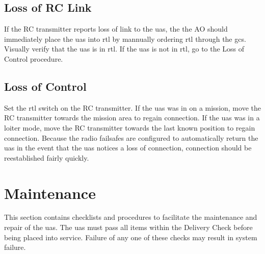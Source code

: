 \documentclass{report}
\begin{document}
	\section{Loss of RC Link}
		If the RC transmitter reports loss of link to the \gls{uas}, the the \gls{AO} should immediately place the \gls{uas} into \gls{rtl} by mannually ordering \gls{rtl} through the \gls{gcs}.  Visually verify that the \gls{uas} is in \gls{rtl}.  If the \gls{uas} is not in \gls{rtl}, go to the Loss of Control procedure.
	\section{Loss of Control}
		Set the \gls{rtl} switch on the RC transmitter.  If the \gls{uas} was in on a mission, move the RC transmitter towards the mission area to regain connection.  If the \gls{uas} was in a loiter mode, move the RC transmitter towards the last known position to regain connection.  Because the radio failsafes are configured to automatically return the \gls{uas} in the event that the \gls{uas} notices a loss of connection, connection should be reestablished fairly quickly.
\chapter{Maintenance}
	This section contains checklists and procedures to facilitate the maintenance and repair of the \gls{uas}.  The \gls{uas} must pass all items within the Delivery Check before being placed into service.  Failure of any one of these checks may result in system failure.
\end{document}
